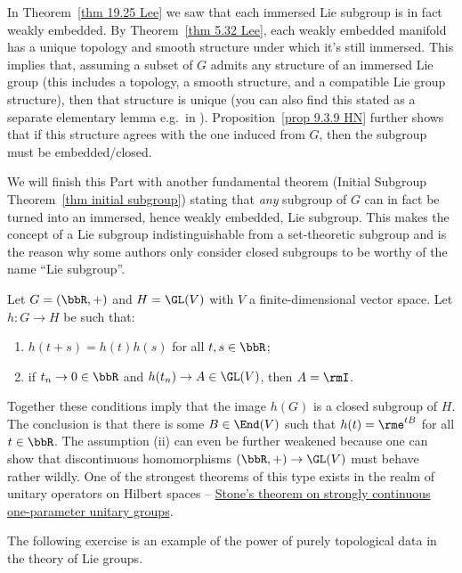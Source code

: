 \begin{rem}\label{rem structure of Lie subgroups}
    In Theorem~\ref{thm 19.25 Lee} we saw that each immersed Lie subgroup is in fact weakly embedded. By Theorem~\ref{thm 5.32 Lee}, each weakly embedded manifold has a unique topology and smooth structure under which it's still immersed. This implies that, assuming a subset of $G$ admits any structure of an immersed Lie group (this includes a topology, a smooth structure, and a compatible Lie group structure), then that structure is unique (you can also find this stated as a separate elementary lemma e.g.~in \cite[Lem.~9.6.12]{HN}). Proposition~\ref{prop 9.3.9 HN} further shows that if this structure agrees with the one induced from $G$, then the subgroup must be embedded/closed. 
    
    We will finish this Part with another fundamental theorem (Initial Subgroup Theorem~\ref{thm initial subgroup}) stating that \emph{any} subgroup of $G$ can in fact be turned into an immersed, hence weakly embedded, Lie subgroup. This makes the concept of a Lie subgroup indistinguishable from a set-theoretic subgroup and is the reason why some authors only consider closed subgroups to be worthy of the name ``Lie subgroup''.
\end{rem}


\begin{example}
    Let $G=(\bbR,+)$ and $H=\GL(V)$ with $V$ a finite-dimensional vector space. Let $h:G\to H$ be such that:
    \begin{enumerate}[label=(\roman*)]
        \item $h(t+s)=h(t)h(s)$ for all $t,s\in\bbR$;
        \item if $t_n\to 0\in\bbR$ and $h(t_n)\to A\in\GL(V)$, then $A=\rmI$.
    \end{enumerate}
    Together these conditions imply that the image $h(G)$ is a closed subgroup of $H$. The conclusion is that there is some $B\in \End(V)$ such that $h(t)=\rme^{tB}$ for all $t\in \bbR$. The assumption (ii) can even be further weakened because one can show that discontinuous homomorphisms $(\bbR,+)\to \GL(V)$ must behave rather wildly. One of the strongest theorems of this type exists in the realm of unitary operators on Hilbert spaces -- \href{https://en.wikipedia.org/wiki/Stone%27s_theorem_on_one-parameter_unitary_groups}{Stone's theorem on strongly continuous one-parameter unitary groups}.
\end{example}

The following exercise is an example of the power of purely topological data in the theory of Lie groups.

